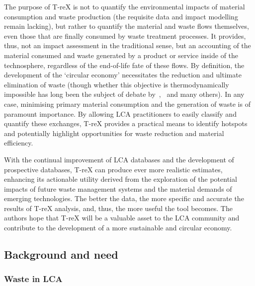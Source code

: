 \documentclass[a4paper,fleqn,longmktitle]{cas-dc}
\begin{document}
The purpose of T-reX is not to quantify the environmental impacts of material consumption and waste production (the requisite data and impact modelling remain lacking), but rather to quantify the material and waste flows themselves, even those that are finally consumed by waste treatment processes. It provides, thus, not an impact assessment in the traditional sense, but an accounting of the material consumed and waste generated by a product or service inside of the technosphere, regardless of the end-of-life fate of these flows. By definition, the development of the `circular economy' necessitates the reduction and ultimate elimination of waste (though whether this objective is thermodynamically impossible has long been the subject of debate by~\cite{ayres1998recycling},~\cite{reuter2012recyclinglimits} and many others). In any case, minimising primary material consumption and the generation of waste is of paramount importance. By allowing LCA practitioners to easily classify and quantify these exchanges, T-reX provides a practical means to identify hotspots and potentially highlight opportunities for waste reduction and material efficiency. 

With the continual improvement of LCA databases and the development of prospective databases, T-reX can produce ever more realistic estimates, enhancing its actionable utility derived from the exploration of the potential impacts of future waste management systems and the material demands of emerging technologies. The better the data, the more specific and accurate the results of T-reX analysis, and, thus, the more useful the tool becomes. The authors hope that T-reX will be a valuable asset to the LCA community and contribute to the development of a more sustainable and circular economy.

\subsection{Background and need}\label{sec:intro-background}

\subsubsection{Waste in LCA}\label{sec:intro-waste}
\end{document}
